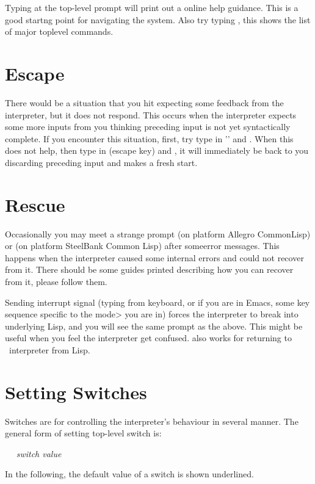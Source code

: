 Typing  at the top-level prompt will print out a online help
guidance. This is a good startng point for navigating the system.
Also try typing , this shows the list of major toplevel commands.

\section{Escape}

There would be a situation that you hit  expecting some feedback from the interpreter, 
but it does not respond. 
This occurs when the interpreter expects some more inputs from you thinking
preceding input is not yet syntactically complete. 
If you encounter this situation, 
first, try type in '' and .
When this does not help, 
then type in (escape key) and , 
it will immediately be back to you discarding preceding input
and makes a fresh start.

\section{Rescue}

Occasionally you may meet a strange prompt  
(on platform Allegro CommonLisp) or \kbd{0]} (on platform
SteelBank Common Lisp) after someerror messages. 
This happens when the interpreter caused some internal
errors and could not recover from it. 
There should be some guides printed describing how you can recover
from it, please follow them.

Sending interrupt signal (typing  from keyboard, or if you
are in Emacs, some key sequence specific to the \<mode> you are in)
forces the interpreter to break into underlying Lisp, and you will see
the same prompt as the above. 
This might be useful when you feel the interpreter get confused.
 also works for returning to \cafeobj\ interpreter from Lisp.

\section{Setting Switches}

Switches are for controlling the interpreter's behaviour in several manner.
The general form of setting top-level switch is:

\ \  {\it switch value\/} 

In the following, the default value of a switch is shown
underlined.

